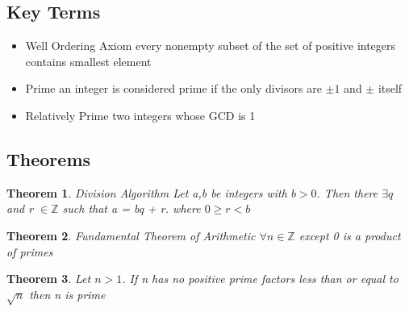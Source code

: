 \documentclass[12pt]{article}
\newtheorem*{theorem*}{Theorem}
\begin{document}
\subsection*{Key Terms}
\begin{itemize}
    \item Well Ordering Axiom \newline
    every nonempty subset of the set of positive integers contains smallest element
    \item Prime \newline
    an integer is considered prime if the only divisors are $\pm 1$ and $\pm$ itself
    \item Relatively Prime \newline
    two integers whose GCD is 1
\end{itemize}
\subsection*{Theorems}
\begin{theorem*}
Division Algorithm \newline
Let a,b be integers with $b > 0$. Then there $\exists q$ and r $\in \mathbb{Z}$ such that a = bq + r. where $0 \geq r < b$
\end{theorem*}
\begin{theorem*}
Fundamental Theorem of Arithmetic \newline
$\forall n \in \mathbb{Z}$ except 0 is a product of primes
\end{theorem*}
\begin{theorem*}
Let $n > 1$. If n has no positive prime factors less than or equal to $\sqrt{n}$ then n is prime
\end{theorem*}
\end{document}
